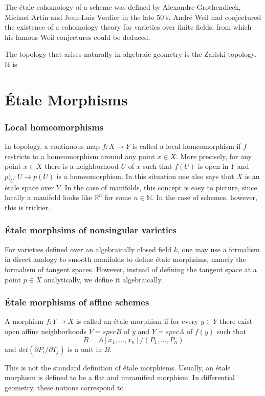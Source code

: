 The \'etale cohomology of a scheme was defined by Alexandre Grothendieck, Michael Artin and Jean-Luis Verdier in the late 50's. Andr\'e Weil had conjectured the existence of a cohomology theory for varieties over finite fields, from which his famous Weil conjectures could be deduced.

The topology that arises naturally in algebraic geometry is the Zariski topology. It is
\section{\'Etale Morphisms}

\subsubsection{Local homeomorphisms}
In topology, a continuous map $f: X \to Y$ is called a local homeomorphism if $f$ restricts to a homeomorphism around any point $x \in X$. More precisely, for any point $x \in X$ there is a neighborhood $U$ of $x$ such that $f(U)$ is open in $Y$ and $p|_U: U \to p(U)$ is a homeomorphism. In this situation one also says that $X$ is an \'etale space over $Y$.
In the case of manifolds, this concept is easy to picture, since locally a manifold looks like $\mathbb{R}^n$ for some $n \in \mathbb{N}$. In the case of schemes, however, this is trickier.

\subsubsection{\'Etale morphsims of nonsingular varieties}
For varieties defined over an algebraically closed field $k$, one may use a formalism in direct analogy to smooth manifolds to define \'etale morphsims, namely the formalism of tangent spaces. However, instead of defining the tangent space at a point $p \in X$ analytically, we define it algebraically.

\subsubsection{\'Etale morphisms of affine schemes}
\begin{definition}
  A morphism $f: Y \to X$ is called an \'etale morphism if for every $y \in Y$ there exist open affine neighborhoods $V = spec B$ of $y$ and $Y = spec A$ of $f(y)$ such that 
  \[B = A[x_1, \dots, x_n]/(P_1, \dots, P_n)\]
  and $det(\partial P_i /\partial T_j)$ is a unit in $B$.
\end{definition}
This is not the standard definition of \'etale morphisms. Usually, an \'etale morphism is defined to be a flat and unramified morphism. In differential geometry, these notions correspond to






